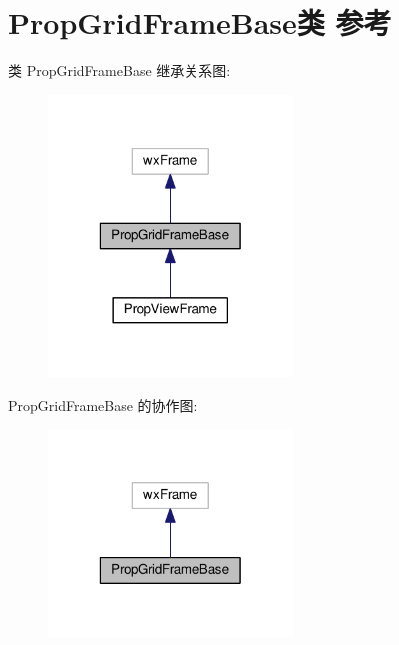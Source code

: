 \hypertarget{class_prop_grid_frame_base}{\section{Prop\+Grid\+Frame\+Base类 参考}
\label{class_prop_grid_frame_base}
}


类 Prop\+Grid\+Frame\+Base 继承关系图\+:
\nopagebreak
\begin{figure}[H]
\begin{center}
\leavevmode
\includegraphics[width=184pt]{class_prop_grid_frame_base__inherit__graph}
\end{center}
\end{figure}


Prop\+Grid\+Frame\+Base 的协作图\+:
\nopagebreak
\begin{figure}[H]
\begin{center}
\leavevmode
\includegraphics[width=184pt]{class_prop_grid_frame_base__coll__graph}
\end{center}
\end{figure}
